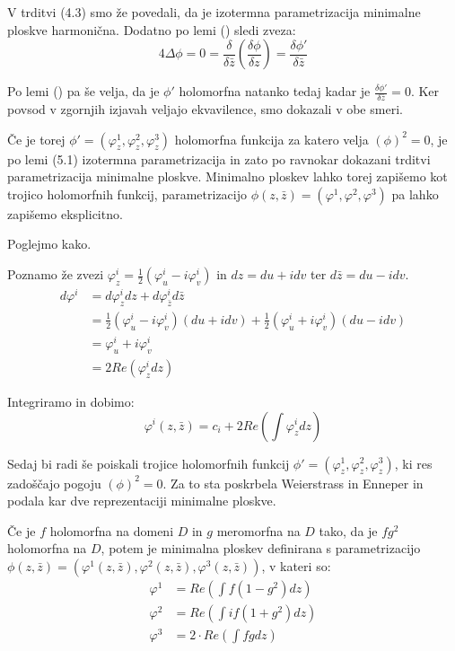 \documentclass[mat1]{fmfdelo}
\begin{document}
\begin{dokaz}
    V trditvi (4.3) smo že povedali, da je izotermna parametrizacija minimalne ploskve harmonična.
    Dodatno po lemi () sledi zveza:
    $$ 4 \Delta \phi = 0 = \frac{\delta}{\delta \bar{z}} \left( \frac{\delta \phi}{\delta z} \right) = \frac{\delta \phi'}{\delta \bar{z}} $$

    Po lemi () pa še velja, da je $\phi'$ holomorfna natanko tedaj kadar je $\frac{\delta \phi'}{\delta \bar{z}} = 0$.
    Ker povsod v zgornjih izjavah veljajo ekvavilence, smo dokazali v obe smeri.
\end{dokaz}

Če je torej $\phi' = \left( \varphi^1_z, \varphi^2_z, \varphi^3_z \right)$ holomorfna funkcija za katero velja
$\left( \phi \right)^2 = 0$, je po lemi (5.1) izotermna parametrizacija in zato po ravnokar dokazani trditvi 
parametrizacija minimalne ploskve.
Minimalno ploskev lahko torej zapišemo kot trojico holomorfnih funkcij, parametrizacijo $\phi (z, \bar{z}) = (\varphi^1, \varphi^2, \varphi^3)$
pa lahko zapišemo eksplicitno.

Poglejmo kako.

Poznamo že zvezi $\varphi_z^{i} = \frac{1}{2} \left( \varphi_u^{i} - i \varphi_v^{i} \right)$ in $dz = du + i dv$ ter $d\bar{z} = du - i dv$.
\begin{align*}
    d \varphi^{i} &= d \varphi^{i}_z dz + d \varphi^{i}_\bar{z} d\bar{z}   \\
    &= \frac{1}{2} \left( \varphi^{i}_u - i \varphi^{i}_v \right) \left( du + i dv \right) + 
    \frac{1}{2} \left( \varphi^{i}_u + i \varphi^{i}_v \right) \left( du - i dv \right)   \\
    &= \varphi^{i}_u + i \varphi^{i}_v   \\
    &= 2 Re \left( \varphi^{i}_z dz \right)
\end{align*}

Integriramo in dobimo:
$$ \varphi^{i} (z, \bar{z}) = c_i + 2 Re \left( \int \varphi_z^{i} dz \right) $$

Sedaj bi radi še poiskali trojice holomorfnih funkcij $\phi' = \left( \varphi^1_z, \varphi^2_z, \varphi^3_z \right)$,
ki res zadoščajo pogoju $\left( \phi \right)^2 = 0$.
Za to sta poskrbela Weierstrass in Enneper in podala kar dve reprezentaciji minimalne ploskve.

\begin{izrek}
    Če je $f$ holomorfna na domeni $D$ in $g$ meromorfna na $D$ tako, da je $fg^2$ holomorfna na $D$,
    potem je minimalna ploskev definirana s parametrizacijo $\phi (z, \bar{z}) = (\varphi^1 (z, \bar{z}), \varphi^2 (z, \bar{z}), \varphi^3 (z, \bar{z}))$,
    v kateri so:
    \begin{align*}
        \varphi^1 &= Re \left( \int f (1 - g^2) dz \right) \\
        \varphi^2 &= Re \left( \int i f (1 + g^2) dz \right) \\
        \varphi^3 &= 2 \cdot Re \left( \int f g dz \right)
    \end{align*}
\end{izrek}
\end{document}
